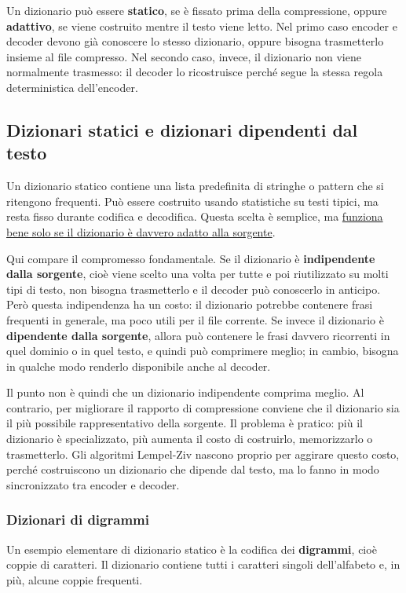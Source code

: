 \documentclass{article}
\theoremstyle{definition}
\numberwithin{equation}{section}
\begin{document}
Un dizionario può essere \textbf{statico}, se è fissato prima della compressione, oppure \textbf{adattivo}, se viene costruito mentre il testo viene letto. Nel primo caso encoder e decoder devono già conoscere lo stesso dizionario, oppure bisogna trasmetterlo insieme al file compresso. Nel secondo caso, invece, il dizionario non viene normalmente trasmesso: il decoder lo ricostruisce perché segue la stessa regola deterministica dell'encoder.

\subsection{Dizionari statici e dizionari dipendenti dal testo}
Un dizionario statico contiene una lista predefinita di stringhe o pattern che si ritengono frequenti. Può essere costruito usando statistiche su testi tipici, ma resta fisso durante codifica e decodifica. Questa scelta è semplice, ma \uline{funziona bene solo se il dizionario è davvero adatto alla sorgente}.

Qui compare il compromesso fondamentale. Se il dizionario è \textbf{indipendente dalla sorgente}, cioè viene scelto una volta per tutte e poi riutilizzato su molti tipi di testo, non bisogna trasmetterlo e il decoder può conoscerlo in anticipo. Però questa indipendenza ha un costo: il dizionario potrebbe contenere frasi frequenti in generale, ma poco utili per il file corrente. Se invece il dizionario è \textbf{dipendente dalla sorgente}, allora può contenere le frasi davvero ricorrenti in quel dominio o in quel testo, e quindi può comprimere meglio; in cambio, bisogna in qualche modo renderlo disponibile anche al decoder.

Il punto non è quindi che un dizionario indipendente comprima meglio. Al contrario, per migliorare il rapporto di compressione conviene che il dizionario sia il più possibile rappresentativo della sorgente. Il problema è pratico: più il dizionario è specializzato, più aumenta il costo di costruirlo, memorizzarlo o trasmetterlo. Gli algoritmi Lempel-Ziv nascono proprio per aggirare questo costo, perché costruiscono un dizionario che dipende dal testo, ma lo fanno in modo sincronizzato tra encoder e decoder.

\subsubsection{Dizionari di digrammi}
Un esempio elementare di dizionario statico è la codifica dei \textbf{digrammi}, cioè coppie di caratteri. Il dizionario contiene tutti i caratteri singoli dell'alfabeto e, in più, alcune coppie frequenti.
\end{document}
